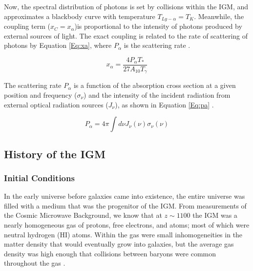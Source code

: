 Now, the spectral distribution of \lya  photons is set by collisions within the IGM, and approximates a blackbody curve with temperature $T_{Ly-\alpha} = T_K$. Meanwhile, the \lya  coupling term ($x_C = x_{\alpha}$)is proportional to the intensity of \lya  photons produced by external sources of light. The exact \lya  coupling is related to the rate of scattering of \lya  photons by Equation \ref{Eq:xa}, where $P_{\alpha}$ is the scattering rate \cite{furlanetto_2006}. 

\begin{equation}\label{Eq:xa}
x_{\alpha} = \frac{4 P_{\alpha} T_*}{27 A_{10} T_{\gamma}}
\end{equation}

The scattering rate $P_{\alpha}$ is a function of the absorption cross section at a given position and frequency ($\sigma_{\nu}$) and the intensity of the incident radiation from external optical radiation sources ($J_{\nu}$), as shown in Equation \ref{Eq:pa} \cite{furlanetto_2006}. 

\begin{equation}\label{Eq:pa}
P_{\alpha} = 4 \pi \int d\nu J_{\nu}(\nu) \sigma_{\nu}(\nu)
\end{equation}


\subsection{History of the IGM} \label{Sec:IGMhist}

\subsubsection{Initial Conditions}

In the early universe before galaxies came into existence, the entire universe was filled with a medium that was the progenitor of the IGM. From measurements of the Cosmic Microwave Background, we know that at $z \sim 1100$ the IGM was a nearly homogeneous gas of protons, free electrons, and atoms; most of which were neutral hydrogen (HI) atoms. Within the gas were small inhomogeneities in the matter density that would eventually grow into galaxies, but the average gas density was high enough that collisions between baryons were common throughout the gas \cite{furlanetto_2006}. 

